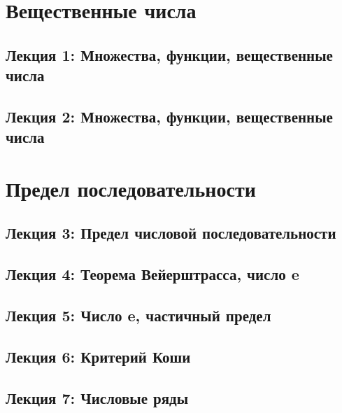 



	
	\maketitle{}
	
	\tableofcontents{}
	
	\large
	
	\chapter{Вещественные числа}
	
	\section*{Лекция 1: Множества, функции, вещественные числа}
	
	\section*{Лекция 2: Множества, функции, вещественные числа}
	
	\chapter{Предел последовательности}
	
	\section*{Лекция 3: Предел числовой последовательности}
	
	\section*{Лекция 4: Теорема Вейерштрасса, число e}
	
	\section*{Лекция 5: Число e, частичный предел}
	
	\section*{Лекция 6: Критерий Коши}
	
	\section*{Лекция 7: Числовые ряды}
	
